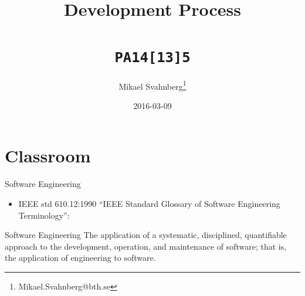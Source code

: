 \documentclass[10pt,t,a4paper]{beamer}
\author{Mikael Svahnberg\thanks{Mikael.Svahnberg@bth.se}}
\date{2016-03-09}
\title{Development Process \\\\ \texttt{PA14[13]5}}
\begin{document}
\maketitle

\section{Classroom}
\label{sec-1}
\begin{frame}[label=sec-1-1]{Software Engineering}
\begin{itemize}
\item IEEE std 610.12:1990 ``IEEE Standard Glossary of Software Engineering Terminology'':
\end{itemize}

\begin{block}{Software Engineering}
The application of a systematic, disciplined, quantifiable approach to the development, operation, and maintenance of software; that is, the application of engineering to software.
\end{block}
\end{frame}
\end{document}
